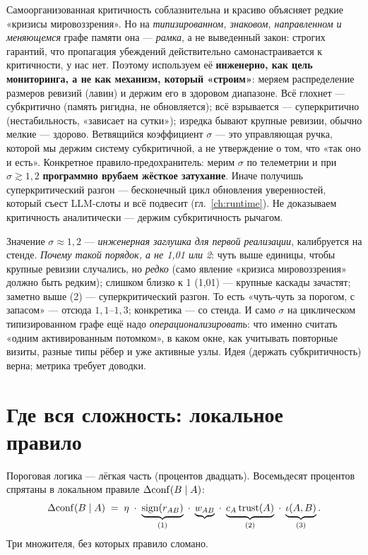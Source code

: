 \begin{pitfall}
Самоорганизованная критичность соблазнительна и красиво объясняет редкие «кризисы
мировоззрения». Но на \emph{типизированном, знаковом, направленном и меняющемся}
графе памяти она — \emph{рамка}, а не выведенный закон: строгих гарантий, что
пропагация убеждений действительно самонастраивается к критичности, у нас нет.
Поэтому используем её \textbf{инженерно, как цель мониторинга, а не как механизм,
который «строим»}: меряем распределение размеров ревизий (лавин) и держим его в
здоровом диапазоне. Всё глохнет — субкритично (память ригидна, не обновляется); всё
взрывается — суперкритично (нестабильность, «зависает на сутки»); изредка бывают
крупные ревизии, обычно мелкие — здорово. Ветвящийся коэффициент $\sigma$ — это
управляющая ручка, которой мы держим систему субкритичной, а не утверждение о том,
что «так оно и есть». Конкретное правило-предохранитель: мерим $\sigma$ по телеметрии
и при $\sigma\gtrsim 1{,}2$ \textbf{программно врубаем жёсткое затухание}. Иначе
получишь суперкритический разгон — бесконечный цикл обновления уверенностей, который
съест LLM-слоты и всё подвесит (гл.~\ref{ch:runtime}). Не доказываем критичность
аналитически — держим субкритичность рычагом.
\end{pitfall}

\begin{openq}
Значение $\sigma\approx 1{,}2$ — \emph{инженерная заглушка для первой реализации},
калибруется на стенде. \emph{Почему такой порядок, а не 1,01 или 2}: чуть выше
единицы, чтобы крупные ревизии случались, но \emph{редко} (само явление «кризиса
мировоззрения» должно быть редким); слишком близко к 1 (1,01) — крупные каскады
зачастят; заметно выше (2) — суперкритический разгон. То есть «чуть-чуть за порогом,
с запасом» — отсюда $1{,}1$--$1{,}3$; конкретика — со стенда. И само $\sigma$ на циклическом типизированном графе ещё надо
\emph{операционализировать}: что именно считать «одним активированным потомком», в
каком окне, как учитывать повторные визиты, разные типы рёбер и уже активные узлы.
Идея (держать субкритичность) верна; метрика требует доводки.
\end{openq}

\section{Где вся сложность: локальное правило}

Пороговая логика — лёгкая часть (процентов двадцать). Восемьдесят процентов
спрятаны в локальном правиле $\Delta\mathrm{conf}(B\mid A)$:
\begin{equation}
\Delta\mathrm{conf}(B\mid A)\;=\;\eta\;\cdot\;\underbrace{\mathrm{sign}(r_{AB})}_{(1)}\;\cdot\;
\underbrace{w_{AB}}_{}\;\cdot\;\underbrace{c_A\,\mathrm{trust}(A)}_{(2)}\;\cdot\;
\underbrace{\iota(A,B)}_{(3)} .
\label{eq:deltaconf}
\end{equation}
Три множителя, без которых правило сломано.

